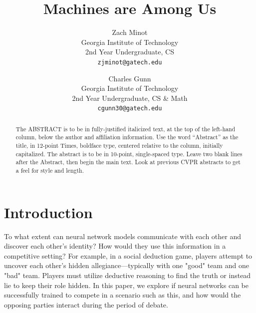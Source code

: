 \documentclass[10pt,twocolumn,letterpaper]{article}
\begin{document}
\title{Machines are Among Us}

\author{Zach Minot\\
Georgia Institute of Technology\\
2nd Year Undergraduate, CS\\
{\tt\small zjminot@gatech.edu}
\and
Charles Gunn\\
Georgia Institute of Technology\\
2nd Year Undergraduate, CS \& Math\\
{\tt\small cgunn30@gatech.edu}
}

\maketitle

\begin{abstract}
   The ABSTRACT is to be in fully-justified italicized text, at the top
   of the left-hand column, below the author and affiliation
   information. Use the word ``Abstract'' as the title, in 12-point
   Times, boldface type, centered relative to the column, initially
   capitalized. The abstract is to be in 10-point, single-spaced type.
   Leave two blank lines after the Abstract, then begin the main text.
   Look at previous CVPR abstracts to get a feel for style and length.
\end{abstract}

\section{Introduction}
To what extent can neural network models communicate with each other and discover
each other's identity? How would they use this information in a competitive setting?
For example, in a social deduction game, players attempt to uncover each other's
hidden allegiance---typically with one "good" team and one "bad" team.
Players must utilize deductive reasoning to find the truth or instead
lie to keep their role hidden. In this paper, we explore 
if neural networks can be successfully trained to
compete in a scenario such as this, and how would the opposing parties interact
during the period of debate.
\end{document}
